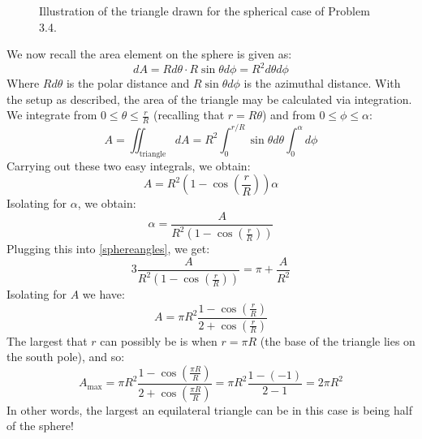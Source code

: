 \begin{figure}[htbp]
    \centering
    \caption{Illustration of the triangle drawn for the spherical case of Problem 3.4.}
    \label{fig3.4}
\end{figure}

\noindent We now recall the area element on the sphere is given as:
\begin{equation}
    dA = R d\theta \cdot R \sin\theta d\phi = R^2 d\theta d\phi 
\end{equation}
Where $Rd\theta$ is the polar distance and $R\sin\theta d\phi$ is the azimuthal distance. With the setup as described, the area of the triangle may be calculated via integration. We integrate from $0 \leq \theta \leq \frac{r}{R}$ (recalling that $r = R\theta$) and from $0 \leq \phi \leq \alpha$:
\begin{equation}
    A = \iint_{\text{triangle}} dA = R^2 \int_{0}^{r/R} \sin\theta d\theta \int_{0}^{\alpha} d\phi 
\end{equation}
Carrying out these two easy integrals, we obtain:
\begin{equation}
    A = R^2 \left(1 - \cos(\frac{r}{R})\right)\alpha
\end{equation}
Isolating for $\alpha$, we obtain:
\begin{equation}
    \alpha = \frac{A}{R^2\left(1 - \cos(\frac{r}{R})\right)}
\end{equation}
Plugging this into \eqref{sphereangles}, we get:
\begin{equation}
    3\frac{A}{R^2\left(1 - \cos(\frac{r}{R})\right)} = \pi + \frac{A}{R^2}
\end{equation}
Isolating for $A$ we have:
\begin{equation}
    A = \pi R^2 \frac{1 - \cos(\frac{r}{R})}{2 + \cos(\frac{r}{R}) }
\end{equation}
The largest that $r$ can possibly be is when $r = \pi R$ (the base of the triangle lies on the south pole), and so:
\begin{equation}
    \boxed{A_{\text{max}} = \pi R^2 \frac{1 - \cos(\frac{\pi R}{R})}{2 + \cos(\frac{\pi R}{R}) } = \pi R^2 \frac{1 - (-1)}{2 - 1} = 2\pi R^2}
\end{equation}
In other words, the largest an equilateral triangle can be in this case is being half of the sphere!

